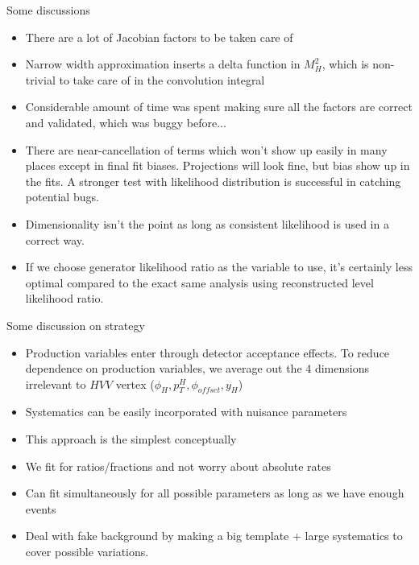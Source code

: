 \documentclass[11pt,t]{beamer}
\begin{document}
\begin{frame}{Some discussions}
   \begin{itemize}
   \item There are a lot of Jacobian factors to be taken care of
   \item Narrow width approximation inserts a delta function in $M_H^2$, which is non-trivial to take care of in the convolution integral
   \item Considerable amount of time was spent making sure all the factors are correct and validated, which was buggy before...
   \item There are near-cancellation of terms which won't show up easily in many places except in final fit biases.
   Projections will look fine, but bias show up in the fits.
   A stronger test with likelihood distribution is successful in catching potential bugs.
   \item Dimensionality isn't the point as long as consistent likelihood is used in a correct way.
   \item If we choose generator likelihood ratio as the variable to use, it's certainly less optimal
   compared to the exact same analysis using reconstructed level likelihood ratio.
   \end{itemize}
\end{frame}

\begin{frame}{Some discussion on strategy}
   \begin{itemize}
   \item Production variables enter through detector acceptance effects.  To reduce dependence on
   production variables, we average out the 4 dimensions irrelevant to $HVV$ vertex ($\phi_H, p_T^H, \phi_{offset}, y_H$)
   \item Systematics can be easily incorporated with nuisance parameters
   \item This approach is the simplest conceptually
   \item We fit for ratios/fractions and not worry about absolute rates
   \item Can fit simultaneously for all possible parameters as long as we have enough events
   \item Deal with fake background by making a big template + large systematics to cover possible variations.
   \end{itemize}
\end{frame}
\end{document}
